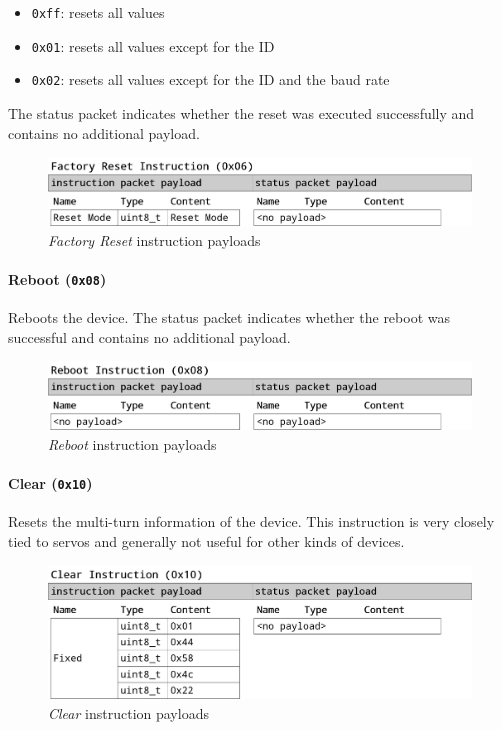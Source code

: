 \begin{itemize}
    \item \lstinline{0xff}: resets all values
    \item \lstinline{0x01}: resets all values except for the ID
    \item \lstinline{0x02}: resets all values except for the ID and the baud rate
\end{itemize}

The status packet indicates whether the reset was executed successfully and contains no additional
payload.

\begin{figure}[H]
    \centering
    \includegraphics[scale=0.2]{img/factory_reset_packet.png}
    \caption{\textit{Factory Reset} instruction payloads}
\end{figure}

\paragraph{Reboot (\lstinline{0x08})}

Reboots the device. The status packet indicates whether the reboot was successful and contains no
additional payload.

\begin{figure}[H]
    \centering
    \includegraphics[scale=0.2]{img/reboot_packet.png}
    \caption{\textit{Reboot} instruction payloads}
\end{figure}

\paragraph{Clear (\lstinline{0x10})}

Resets the multi-turn information of the device. This instruction is very closely tied to servos
and generally not useful for other kinds of devices.

\begin{figure}[H]
    \centering
    \includegraphics[scale=0.2]{img/clear_packet.png}
    \caption{\textit{Clear} instruction payloads}
\end{figure}

